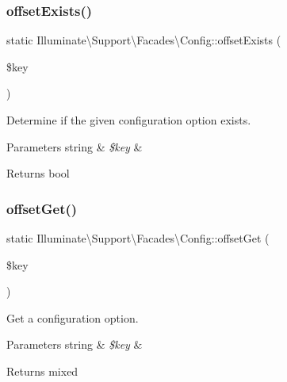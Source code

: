 \subsubsection{\texorpdfstring{offset\+Exists()}{offsetExists()}}
{\footnotesize\ttfamily static Illuminate\textbackslash{}\+Support\textbackslash{}\+Facades\textbackslash{}\+Config\+::offset\+Exists (\begin{DoxyParamCaption}\item[{}]{\$key }\end{DoxyParamCaption})\hspace{0.3cm}{\ttfamily [static]}}

Determine if the given configuration option exists.


\begin{DoxyParams}[1]{Parameters}
string & {\em \$key} & \\
\hline
\end{DoxyParams}
\begin{DoxyReturn}{Returns}
bool 
\end{DoxyReturn}
\mbox{\label{class_illuminate_1_1_support_1_1_facades_1_1_config_aafef797ee6d2b5dd5fb4c152015da9c4}} 
\subsubsection{\texorpdfstring{offset\+Get()}{offsetGet()}}
{\footnotesize\ttfamily static Illuminate\textbackslash{}\+Support\textbackslash{}\+Facades\textbackslash{}\+Config\+::offset\+Get (\begin{DoxyParamCaption}\item[{}]{\$key }\end{DoxyParamCaption})\hspace{0.3cm}{\ttfamily [static]}}

Get a configuration option.


\begin{DoxyParams}[1]{Parameters}
string & {\em \$key} & \\
\hline
\end{DoxyParams}
\begin{DoxyReturn}{Returns}
mixed 
\end{DoxyReturn}
\mbox{\label{class_illuminate_1_1_support_1_1_facades_1_1_config_ac8f6afca8969d60e4e3aab883debcaee}} 
